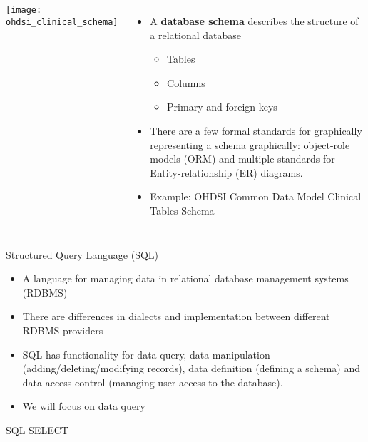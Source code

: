 \documentclass[aspectratio=169]{beamer}
\begin{document}
	\begin{frame}
		
		\begin{columns}
				\texttt{[image: ohdsi\_clinical\_schema]}
			\small
				\begin{itemize}
					\item A \textbf{database schema} describes the structure of a relational database
					\begin{itemize}
						\item Tables
						\item Columns
						\item Primary and foreign keys
					\end{itemize}
					\item There are a few formal standards for graphically representing a schema graphically: object-role models (ORM) and multiple standards for Entity-relationship (ER) diagrams.
					\item Example: OHDSI Common Data Model Clinical Tables Schema
				\end{itemize}
		\end{columns}		
	\end{frame}

	\begin{frame}{Structured Query Language (SQL)}
		
		\begin{itemize}[<+->]
			\item A language for managing data in relational database management systems (RDBMS)
			\item There are differences in dialects and implementation between different RDBMS providers
			\item SQL has functionality for data query, data manipulation (adding/deleting/modifying records), data definition (defining a schema) and data access control (managing user access to the database).
			\item We will focus on data query
		\end{itemize}
	\end{frame}

	\begin{frame}{SQL SELECT}
	\end{frame}
\end{document}
